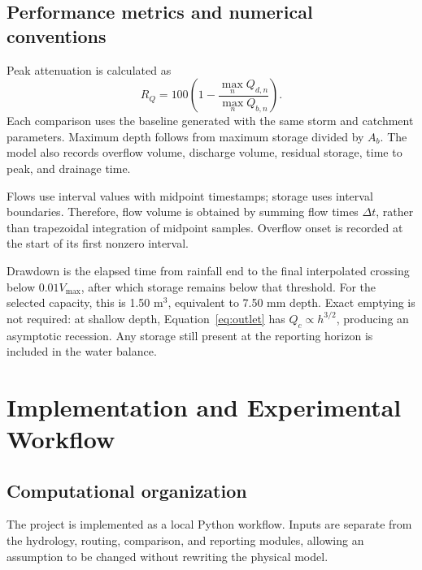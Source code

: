 \documentclass[11pt,letterpaper]{article}
\begin{document}
\subsection{Performance metrics and numerical conventions}
Peak attenuation is calculated as
\begin{equation}
 R_Q=100\left(1-\frac{\max_n Q_{d,n}}{\max_n Q_{b,n}}\right).
 \label{eq:reduction}
\end{equation}
Each comparison uses the baseline generated with the same storm and catchment
parameters. Maximum depth follows from maximum storage divided by $A_b$.
The model also records overflow volume, discharge volume, residual storage,
time to peak, and drainage time.

Flows use interval values with midpoint timestamps; storage uses interval
boundaries. Therefore, flow volume is obtained by summing flow times
$\Delta t$, rather than trapezoidal integration of midpoint samples. Overflow
onset is recorded at the start of its first nonzero interval.

Drawdown is the elapsed time from rainfall end to the final interpolated
crossing below $0.01V_{\max}$, after which storage remains below that threshold.
For the selected capacity, this is 1.50 m$^3$, equivalent to 7.50 mm depth.
Exact emptying is not required: at shallow depth,
Equation~\eqref{eq:outlet} has $Q_c\propto h^{3/2}$, producing an asymptotic
recession. Any storage still present at the reporting horizon is included in
the water balance.

\clearpage
\section{Implementation and Experimental Workflow}\label{sec:implementation}
\subsection{Computational organization}
The project is implemented as a local Python workflow. Inputs are separate
from the hydrology, routing, comparison, and reporting modules, allowing an
assumption to be changed without rewriting the physical model.
\end{document}
